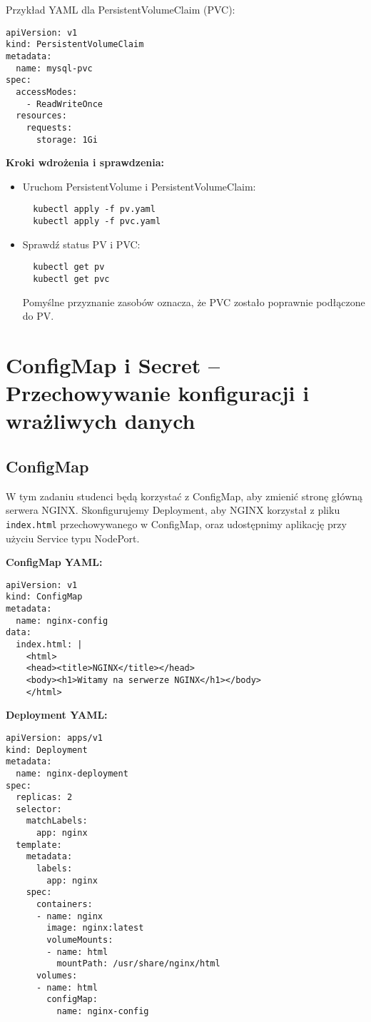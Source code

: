 \documentclass{article}
\begin{document}
Przykład YAML dla PersistentVolumeClaim (PVC):
\begin{lstlisting}
apiVersion: v1
kind: PersistentVolumeClaim
metadata:
  name: mysql-pvc
spec:
  accessModes:
    - ReadWriteOnce
  resources:
    requests:
      storage: 1Gi
\end{lstlisting}

\textbf{Kroki wdrożenia i sprawdzenia:}
\begin{itemize}
  \item Uruchom PersistentVolume i PersistentVolumeClaim:
  \begin{lstlisting}
  kubectl apply -f pv.yaml
  kubectl apply -f pvc.yaml
  \end{lstlisting}
  \item Sprawdź status PV i PVC:
  \begin{lstlisting}
  kubectl get pv
  kubectl get pvc
  \end{lstlisting}
  Pomyślne przyznanie zasobów oznacza, że PVC zostało poprawnie podłączone do PV.
\end{itemize}

\section{ConfigMap i Secret – Przechowywanie konfiguracji i wrażliwych danych}

\subsection{ConfigMap} 
W tym zadaniu studenci będą korzystać z ConfigMap, aby zmienić stronę główną serwera NGINX. Skonfigurujemy Deployment, aby NGINX korzystał z pliku \texttt{index.html} przechowywanego w ConfigMap, oraz udostępnimy aplikację przy użyciu Service typu NodePort.

\textbf{ConfigMap YAML:}
\begin{lstlisting}
apiVersion: v1
kind: ConfigMap
metadata:
  name: nginx-config
data:
  index.html: |
    <html>
    <head><title>NGINX</title></head>
    <body><h1>Witamy na serwerze NGINX</h1></body>
    </html>
\end{lstlisting}

\textbf{Deployment YAML:}
\begin{lstlisting}
apiVersion: apps/v1
kind: Deployment
metadata:
  name: nginx-deployment
spec:
  replicas: 2
  selector:
    matchLabels:
      app: nginx
  template:
    metadata:
      labels:
        app: nginx
    spec:
      containers:
      - name: nginx
        image: nginx:latest
        volumeMounts:
        - name: html
          mountPath: /usr/share/nginx/html
      volumes:
      - name: html
        configMap:
          name: nginx-config
\end{lstlisting}
\end{document}
